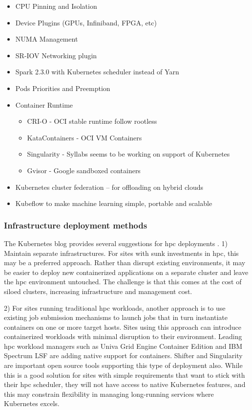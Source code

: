 \documentclass[12pt]{article}
\begin{document}
\begin{itemize}
    \item CPU Pinning and Isolation
    \item Device Plugins (GPUs, Infiniband, FPGA, etc)
    \item NUMA Management
    \item SR-IOV Networking plugin
    \item Spark 2.3.0 with Kubernetes scheduler instead of Yarn
    \item Pods Priorities and Preemption
    \item Container Runtime
        \begin{itemize}
        \item CRI-O - OCI stable runtime follow rootless
        \item KataContainers - OCI VM Containers
        \item Singularity - Syllabs seems to be working on support of Kubernetes
        \item Gvisor - Google sandboxed containers
    \end{itemize}
    \item Kubernetes cluster federation – for offloading on hybrid clouds
    \item Kubeflow to make machine learning simple, portable and scalable
\end{itemize}

\subsubsection{Infrastructure deployment methods}
The Kubernetes blog provides several suggestions for \gls{hpc} deployments \cite{kubernetes-blog-hpc}. 1) Maintain separate infrastructures. For sites with sunk investments in \gls{hpc}, this may be a preferred approach. Rather than disrupt existing environments, it may be easier to deploy new containerized applications on a separate cluster and leave the \gls{hpc} environment untouched. The challenge is that this comes at the cost of siloed clusters, increasing infrastructure and management cost.

2) For sites running traditional \gls{hpc} workloads, another approach is to use existing job submission mechanisms to launch jobs that in turn instantiate containers on one or more target hosts. Sites using this approach can introduce containerized workloads with minimal disruption to their environment. Leading \gls{hpc} workload managers such as Univa Grid Engine Container Edition and IBM Spectrum LSF are adding native support for containers. Shifter and Singularity are important open source tools supporting this type of deployment also. While this is a good solution for sites with simple requirements that want to stick with their \gls{hpc} scheduler, they will not have access to native Kubernetes features, and this may constrain flexibility in managing long-running services where Kubernetes excels.
\end{document}
